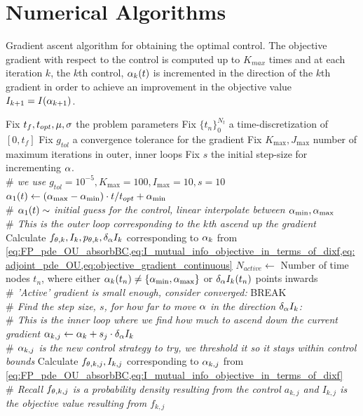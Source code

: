 \documentclass{article}
\begin{document}
\clearpage

\section{Numerical Algorithms}
\begin{algorithm}
\begin{algorithmic}
\caption{Gradient ascent algorithm for obtaining the optimal control.
The objective gradient with respect to the control is computed up to $K_{max}$
times and at each iteration $k$, the $k$th control, ${\alpha}_k(t)$ is incremented in
the direction of the $k$th gradient in order to achieve an improvement in the
objective value $I_{k+1}  = I({\alpha}_{k+1})$.}
\label{alg:gradient_ascent_4_OC}
\State Fix $t_f, t_{opt}, {\mu }, {\sigma }$ the problem parameters
\State Fix $\{t_n\}_0^{N_t}$ a time-discretization of $[0,t_f]$
\State Fix $g_{tol}$ a convergence tolerance for the gradient
\State Fix $K_{\max}, J_{\max}$ number of maximum iterations in outer, inner
loops
\State Fix $s$ the initial step-size for incrementing ${\alpha}$. 
\\ {\itshape $\#$ we use $g_{tol}=10^{-5},K_{\max}=100,I_{\max}=10,s=10$}
\State ${\alpha}_1(t) \gets ({ {\alpha}_{\textrm{max}} }-{ {\alpha}_{\textrm{min}} }) \cdot t / t_{opt} + { {\alpha}_{\textrm{min}} }$ 
\\{\itshape  $\#$ ${\alpha}_1(t) \sim$ initial guess for the control, linear
interpolate between ${ {\alpha}_{\textrm{min}} }, { {\alpha}_{\textrm{max}} }$}
\\ {\itshape $\#$ This is the outer loop corresponding to the $k$th ascend up
the gradient} \State Calculate $f_{{\theta},k},I_{k},p_{{\theta},k}, \delta_{\alpha} I_k$ corresponding to ${\alpha}_k$ from
	\cref{eq:FP_pde_OU_absorbBC,eq:I_mutual_info_objective_in_terms_of_dixf,eq:adjoint_pde_OU,eq:objective_gradient_continuous}
	\State $N_{active}\gets$   Number of time nodes $t_n$, where either
	${\alpha}_k(t_n) \neq \{{ {\alpha}_{\textrm{min}} }, { {\alpha}_{\textrm{max}} }\}$ or $\delta_{\alpha} I_k(t_n)$ points inwards
		  \\ {\itshape  $\#$ 'Active' gradient is small enough,
		 consider converged:}
		 \State BREAK
	\EndIf
	\\ {\itshape $\#$ Find the step size, $s$, for how far to move ${\alpha}$ in the
	direction $\delta_{\alpha} I_k$:}
	\\ {\itshape $\#$ This is the inner loop where we find how much to ascend down
	the current gradient}
	\State ${\alpha}_{k,j} \gets {\alpha}_{k} + s_j \cdot \delta_{\alpha} I_k  $
	\\ {\itshape $\#$ ${\alpha}_{k,j}$ is the new control strategy to try, we threshold
	it so it stays within control bounds}
	 \State Calculate $f_{{\theta},k,j}, I_{k,j}$
	corresponding to ${\alpha}_{k,j}$ from
		\cref{eq:FP_pde_OU_absorbBC,eq:I_mutual_info_objective_in_terms_of_dixf}
		\\ {\itshape $\#$ Recall $f_{{\theta},k,j}$ is a probability density resulting from
		the control $a_{k,j}$ and $I_{k,j}$ is the objective value resulting from $f_{k,j}$}
    \end{algorithmic}
    \end{algorithm}
\end{document}
